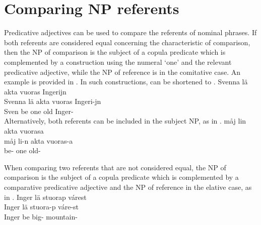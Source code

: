 \section{Comparing NP referents}\label{comparingNPs}
Predicative adjectives can be used to compare the referents of nominal phrases. If both referents are considered equal concerning the characteristic of comparison, then the NP of comparison is the subject of a copula predicate which is complemented by a construction using the numeral  ‘one’ and the relevant predicative adjective, while the NP of reference is in the comitative case. An example is provided in . In such constructions,  can be shortened to . 
\ea\label{comparingNPsEx1}
\glll	Svenna lä akta vuoras Ingerijn\\
	Svenna lä akta vuoras Ingeri-jn\\
	Sven\BS{} be\BS{} one old\BS{} Inger-\\\nopagebreak
{}	%
\z
Alternatively, both referents can be included in the subject NP, as in . %
\ea\label{comparingNPsEx2}
\glll	måj lin akta vuorasa\\
	måj li-n akta vuoras-a\\
	 be- one old-\\\nopagebreak
{}	
\z

When comparing two referents that are not considered equal, the NP of comparison is the subject of a copula predicate which is complemented by a comparative predicative adjective and the NP of reference in the elative case, as in . %
\ea\label{comparingNPsEx3}
\glll	Inger lä stuorap várest\\
	Inger lä stuora-p váre-st\\
	Inger\BS{} be\BS{} big-\BS{} mountain-\\\nopagebreak
{}	
\z

